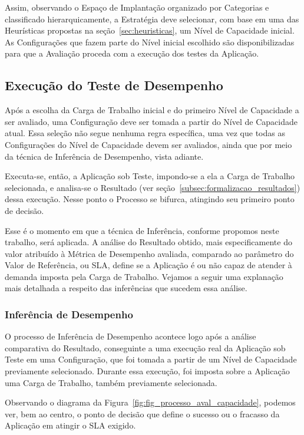 Assim, observando o Espaço de Implantação organizado por Categorias e classificado
hierarquicamente, a Estratégia deve selecionar, com base em uma das Heurísticas 
propostas na seção~\ref{sec:heuristicas}, um Nível de Capacidade inicial. As 
Configurações que fazem parte do Nível inicial escolhido são disponibilizadas 
para que a Avaliação proceda com a execução dos testes da Aplicação.

\subsection{Execução do Teste de Desempenho}
\label{subsec:processo_execucao}
Após a escolha da Carga de Trabalho inicial e do primeiro Nível de Capacidade a
ser avaliado, uma Configuração deve ser tomada a partir do Nível de Capacidade 
atual. Essa seleção não segue nenhuma regra específica, uma vez que todas as 
Configurações do Nível de Capacidade devem ser avaliados, ainda que por meio da técnica de 
Inferência de Desempenho, vista adiante.
 
Executa-se, então, a Aplicação sob Teste, impondo-se a ela a Carga de Trabalho 
selecionada, e analisa-se o Resultado (ver seção~\ref{subsec:formalizacao_resultados}) 
dessa execução. Nesse ponto o Processo se bifurca, atingindo seu primeiro ponto 
de decisão.

Esse é o momento em que a técnica de Inferência, conforme propomos neste trabalho,
será aplicada. A análise do Resultado obtido, mais especificamente do valor atribuído
à Métrica de Desempenho avaliada, comparado ao parâmetro do Valor de Referência, 
ou SLA, define se a Aplicação é ou não capaz de atender à demanda imposta pela
Carga de Trabalho. Vejamos a seguir uma explanação mais detalhada a respeito das
inferências que sucedem essa análise.  

\subsubsection{Inferência de Desempenho}
O processo de Inferência de Desempenho acontece logo após a análise comparativa
do Resultado, conseguinte a uma execução real da Aplicação sob Teste em uma 
Configuração, que foi tomada a partir de um Nível de Capacidade previamente 
selecionado. Durante essa execução, foi imposta sobre a Aplicação uma Carga de 
Trabalho, também previamente selecionada.

Observando o diagrama da Figura~\ref{fig:fig_processo_aval_capacidade}, podemos 
ver, bem ao centro, o ponto de decisão que define o sucesso ou o fracasso da 
Aplicação em atingir o SLA exigido. 

